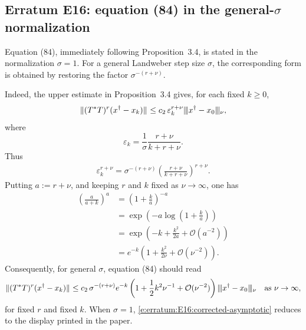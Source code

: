 
\subsection*{Erratum E16: equation (84) in the general-$\sigma$ normalization}
\label{s:erratum:E16}

Equation (84), immediately following Proposition~3.4, is stated in the
normalization $\sigma=1$.  For a general Landweber step size $\sigma$,
the corresponding form is obtained by restoring the factor
$\sigma^{-(r+\nu)}$.

Indeed, the upper estimate in Proposition~3.4 gives, for each
fixed $k\geq0$,
\begin{align}
\label{e:erratum:E16:upper}
        \| (T^*T)^r(x^\dag-x_k) \|_{  }
        \leq
        c_2\,\varepsilon_k^{r+\nu}
        \vert\kern-0.25ex\vert\kern-0.25ex\vert x^\dag-x_0 \vert\kern-0.25ex \vert\kern-0.25ex\vert_{ \nu },
\end{align}
where
\[
        \varepsilon_k
        =
        \frac{1}{\sigma}
        \frac{r+\nu}{k+r+\nu} .
\]
Thus
\begin{align}
\label{e:erratum:E16:restored}
        \varepsilon_k^{r+\nu}
        =
        \sigma^{-(r+\nu)}
        \left(
                \frac{r+\nu}{k+r+\nu}
        \right)^{r+\nu} .
\end{align}
Putting $a:=r+\nu$, and keeping $r$ and $k$ fixed as
$\nu\to\infty$, one has
\begin{align*}
        \left(\frac{a}{a+k}\right)^a
        & =
        \left(1+\frac{k}{a}\right)^{-a}
        \\
        & =
        \exp\left(
                -a\log\left(1+\frac{k}{a}\right)
        \right)
        \\
        & =
        \exp\left(
                -k + \frac{k^2}{2a} + \mathcal{O}(a^{-2})
        \right)
        \\
        & =
        e^{-k}
        \left(
                1 + \frac{k^2}{2\nu}
                + \mathcal{O}(\nu^{-2})
        \right).
\end{align*}
Consequently, for general $\sigma$, equation (84) should read
\begin{align}
\label{e:erratum:E16:corrected-asymptotic}
        \|  (T^* T)^r (x^\dag - x_k)  \|_{  }
        \leq
        c_2\,
        \sigma^{-(r+\nu)}
        e^{-k}
        \left(
                1 + \frac12 k^2 \nu^{-1}
                + \mathcal{O}(\nu^{-2})
        \right)
        \vert\kern-0.25ex\vert\kern-0.25ex\vert x^\dag-x_0 \vert\kern-0.25ex \vert\kern-0.25ex\vert_{ \nu }
        \quad\text{as }\nu\to\infty,
\end{align}
for fixed $r$ and fixed $k$.  When $\sigma=1$,
\eqref{e:erratum:E16:corrected-asymptotic} reduces to the display
printed in the paper.

